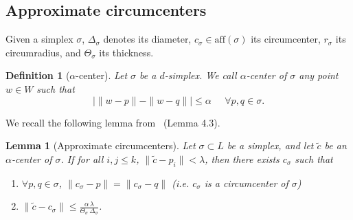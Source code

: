 \documentclass[11pt,a4paper]{article}
\newtheorem{definition}{Definition}
\newtheorem{lemma}{Lemma}
\newcommand{\aff}{{\mbox{aff}}}
\begin{document}

\subsection{Approximate circumcenters} %

Given a simplex $\sigma$, $\Delta_{\sigma}$ denotes its diameter,
$c_{\sigma} \in \aff (\sigma)$ its circumcenter, $r_{\sigma}$ its
circumradius, and $\Theta_{\sigma}$ its thickness.

\begin{definition}[$\alpha$-center]
Let $\sigma$ be a $d$-simplex. We
call $\alpha$-center of $\sigma$ any point $w\in W$ such that 
$$| \| w -p\| - \| w -q\| |  \leq \alpha \;\;\;\;\; \forall p,q \in \sigma .$$

\end{definition}

We recall the following lemma from~\cite{boissonnat:hal-00807050}
(Lemma 4.3).

\begin{lemma}[Approximate circumcenters]
\label{lemma-stability}
Let $\sigma\subset L$ be a simplex, and let
$\tilde{c}$ be an $\alpha$-center of $\sigma$. If  for all
$i,j\leq k$,
$\| \tilde{c}-p_i\| < \lambda$,
then there exists  $c_{\sigma}$ such that
\begin{enumerate}
\item $\forall p,q\in \sigma$, $\| c_{\sigma}-p\| = \| c_{\sigma}-q\|
  $ (i.e. $c_{\sigma}$ is a circumcenter of $\sigma$)
\item $\| \tilde{c}-c_{\sigma}\| \leq
\frac{\alpha\,
  \lambda}{\Theta_{\sigma} \, \Delta_{\sigma}}$.
\end{enumerate}
\end{lemma}
\end{document}
